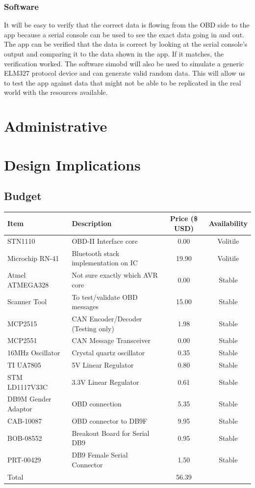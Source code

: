 \documentclass[12pt,letterpaper]{article}
\begin{document}
\subsubsection{Software}
It will be easy to verify that the correct data is flowing from the OBD side to the app because a serial console can be used to see the exact data going in and out. The app can be verified that the data is correct by looking at the serial console's output and comparing it to the data shown in the app. If it matches, the verification worked. The software simobd will also be used to simulate a generic ELM327 protocol device and can generate valid random data. This will allow us to test the app against data that might not be able to be replicated in the real world with the resources available. 

\newpage

\section{Administrative}


\newpage

\section{Design Implications}
\subsection{Budget}
\begin{tabular}{| l | p{7cm} | c | c |}
\hline
Item & Description & Price (\$ USD) & Availability \\ \hline
STN1110 & OBD-II Interface core & 0.00 & Volitile \\ \hline
Microchip RN-41 & Bluetooth stack implementation on IC & 19.90 & Volitile \\ \hline
Atmel ATMEGA328 & Not sure exactly which AVR core & 0.00 & Stable \\ \hline
Scanner Tool & To test/validate OBD messages & 15.00 & Stable\\ \hline
MCP2515 & CAN Encoder/Decoder (Testing only) & 1.98 & Stable\\ \hline
MCP2551 & CAN Message Transceiver & 0.00 & Stable\\ \hline
16MHz Oscillator & Crystal quartz oscillator & 0.35 & Stable \\ \hline
TI UA7805 & 5V Linear Regulator & 0.80 & Stable \\ \hline
STM LD1117V33C & 3.3V Linear Regulator & 0.61 & Stable \\ \hline 
DB9M Gender Adaptor & OBD connection & 5.35 & Stable \\ \hline
CAB-10087 & OBD connector to DB9F & 9.95 & Stable \\ \hline
BOB-08552 & Breakout Board for Serial DB9 & 0.95 & Stable \\ \hline
PRT-00429 & DB9 Female Serial Connector & 1.50 & Stable \\ \hline
\hline
Total && 56.39 & \\ \hline
\end{tabular}
\end{document}
